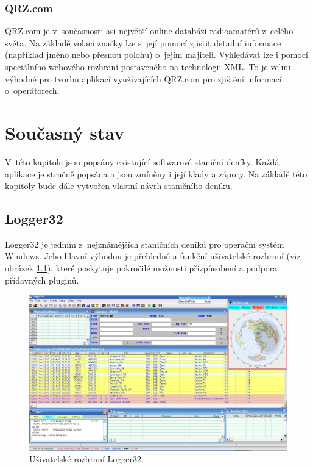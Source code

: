 \subsection{QRZ.com}

QRZ.com je v~současnosti asi největší online databází radioamatérů z~celého světa. Na základě volací značky lze s~její pomocí zjistit detailní
informace (například jméno nebo přesnou polohu) o~jejím majiteli. Vyhledávat lze i pomocí speciálního webového rozhraní
postaveného na technologii XML. To je velmi výhodné pro tvorbu aplikací využívajících QRZ.com pro zjištění informací
o~operátorech.

\chapter{Současný stav}
\label{soucasnost}

V~této kapitole jsou popsány existující softwarové staniční deníky. Každá aplikace je stručně
popsána a jsou zmíněny i její klady a zápory. Na základě této kapitoly bude dále
vytvořen vlastní návrh staničního deníku.

\section{Logger32}%

Logger32 je jedním z~nejznámějších staničních deníků pro operační systém Windows. Jeho hlavní výhodou je přehledné a funkční
uživatelské rozhraní (viz obrázek \ref{fig:logger32}), které poskytuje pokročilé možnosti přizpůsobení a podpora přídavných pluginů.

\begin{figure}[h]
\centering
\includegraphics[trim=0cm 0cm 0cm 0cm, scale=0.33]{fig/logger32}
\caption{Uživatelské rozhraní Logger32.}
\label{fig:logger32}
\end{figure}

